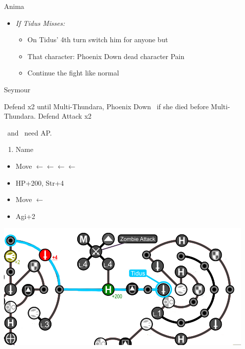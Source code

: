 \begin{battle}[18000]{Anima}
	\begin{itemize}
		\item \textit{If Tidus Misses:}
			\begin{itemize}
				\item On Tidus' 4th turn switch him for anyone but \yuna
				\item That character: Phoenix Down dead character
				\enemyf Pain
				\item Continue the fight like normal
			\end{itemize}
	\end{itemize}
\end{battle}
\begin{battle}[6000]{Seymour}
	\begin{itemize}
		\tidusf Defend x2 until Multi-Thundara, Phoenix Down \rikku\ if she died before Multi-Thundara.
		\rikkuf Defend
		\tidusf Attack x2
	\end{itemize}
	\tidus\ and \yuna\ need AP.
\end{battle}
\begin{enumerate}[resume]
	\item Name \shiva
\end{enumerate}
\begin{spheregrid}
	\begin{itemize}
		\tidusf
		\begin{itemize}
			\item Move $\leftarrow\leftarrow\leftarrow\leftarrow$
			\item HP+200, Str+4
			\item Move $\leftarrow$
			\item Agi+2
		\end{itemize}
		\includegraphics[width=.8\columnwidth]{graphics/Tidus_Post_Seymour}
	\end{itemize}
\end{spheregrid}
